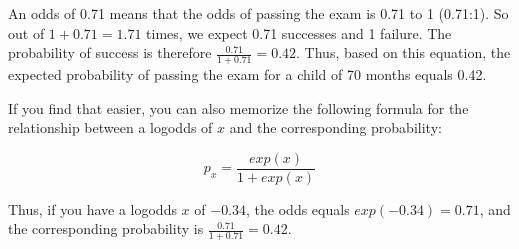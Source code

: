 \documentclass[]{book}\usepackage[]{graphicx}\usepackage[]{color}
\begin{document}
An odds of 0.71 means that the odds of passing the exam is 0.71 to 1 (0.71:1). So out of $1 + 0.71= 1.71$ times, we expect 0.71 successes and 1 failure. The probability of success is therefore $\frac{0.71}{1+0.71} = 0.42$. Thus, based on this equation, the expected probability of passing the exam for a child of 70 months equals 0.42.

If you find that easier, you can also memorize the following formula for the relationship between a logodds of $x$ and the corresponding probability:


\begin{equation}
\label{eq:logistic1}
p_x = \frac{exp(x)}{1+exp(x)}
\end{equation}

Thus, if you have a logodds $x$ of $-0.34$, the odds equals $exp(-0.34)=0.71$, and
the corresponding probability is $\frac{0.71}{1+0.71} = 0.42$.
\end{document}
